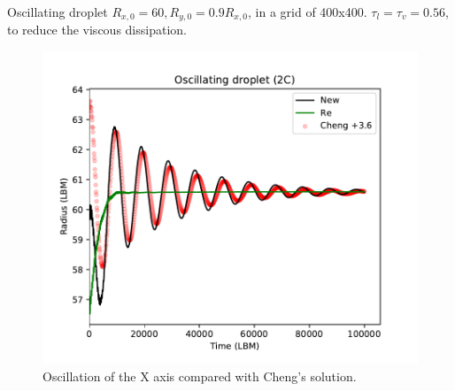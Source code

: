 \documentclass{beamer}
\begin{document}
	\begin{frame}{Oscillating droplet}
		$R_{x,0} = 60, R_{y,0} = 0.9 R_{x,0}$, in a grid of 400x400. $\tau_l = \tau_v = 0.56$, to reduce the viscous dissipation.
		\begin{figure}[h]
			\centering
			\includegraphics[scale=0.4]{pics/2cOsc.pdf}
			\caption{Oscillation of the X axis compared with Cheng's solution.}
			\label{fig:2cOsc}
		\end{figure}
	\end{frame}
	
\end{document}
